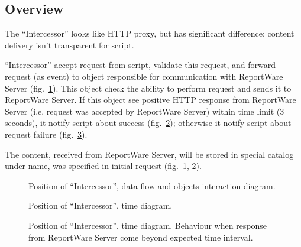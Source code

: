 \documentclass[a4paper,twoside]{article}
\newcommand{\Inter}{{\fontseries{b}\selectfont ``Intercessor''}}
\begin{document}
\subsection{Overview}

The \Inter{} looks like HTTP proxy, but has significant difference: content
delivery isn't transparent for script.

\Inter{} accept request from script, validate this request, and forward request
(as event) to object responsible for communication with ReportWare Server (fig.~\ref{IntercessorObjDiagram}).
This object check 
the ability to perform request and sends it to ReportWare Server. If this object
see positive HTTP response from ReportWare Server (i.e. request was accepted by ReportWare Server)
within time limit (3 seconds), it notify script about success (fig.~\ref{IntercessorTimeDiagram}); otherwise it
notify script about request failure (fig.~\ref{IntercessorTimeDiagramNeg}).

The content, received from
ReportWare Server, will be stored in special catalog under name, was specified in initial
request (fig.~\ref{IntercessorObjDiagram}, \ref{IntercessorTimeDiagram}).


\begin{figure}
\begin{center}
%  
\end{center}
\caption{Position of \Inter{}, data flow and objects interaction diagram.\label{IntercessorObjDiagram}}
\end{figure}

\begin{figure}
\begin{center}
%  
\end{center}
\caption{Position of \Inter{}, time diagram.\label{IntercessorTimeDiagram}}
\end{figure}

\begin{figure}
\begin{center}
\end{center}
\caption{Position of \Inter{}, time diagram. Behaviour when response from ReportWare Server come beyond expected time interval.\label{IntercessorTimeDiagramNeg}}
\end{figure}
\end{document}

